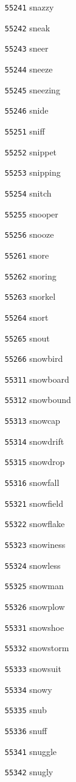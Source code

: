 \documentclass[twoside,11pt]{article}
\begin{document}
\begin{multicols}{5}
\begin{enumerate}
\item[\texttt{55241}] snazzy
\item[\texttt{55242}] sneak
\item[\texttt{55243}] sneer
\item[\texttt{55244}] sneeze
\item[\texttt{55245}] sneezing
\item[\texttt{55246}] snide
\item[\texttt{55251}] sniff
\item[\texttt{55252}] snippet
\item[\texttt{55253}] snipping
\item[\texttt{55254}] snitch
\item[\texttt{55255}] snooper
\item[\texttt{55256}] snooze
\item[\texttt{55261}] snore
\item[\texttt{55262}] snoring
\item[\texttt{55263}] snorkel
\item[\texttt{55264}] snort
\item[\texttt{55265}] snout
\item[\texttt{55266}] snowbird
\item[\texttt{55311}] snowboard
\item[\texttt{55312}] snowbound
\item[\texttt{55313}] snowcap
\item[\texttt{55314}] snowdrift
\item[\texttt{55315}] snowdrop
\item[\texttt{55316}] snowfall
\item[\texttt{55321}] snowfield
\item[\texttt{55322}] snowflake
\item[\texttt{55323}] snowiness
\item[\texttt{55324}] snowless
\item[\texttt{55325}] snowman
\item[\texttt{55326}] snowplow
\item[\texttt{55331}] snowshoe
\item[\texttt{55332}] snowstorm
\item[\texttt{55333}] snowsuit
\item[\texttt{55334}] snowy
\item[\texttt{55335}] snub
\item[\texttt{55336}] snuff
\item[\texttt{55341}] snuggle
\item[\texttt{55342}] snugly

\end{enumerate}
\end{multicols}
\end{document}
